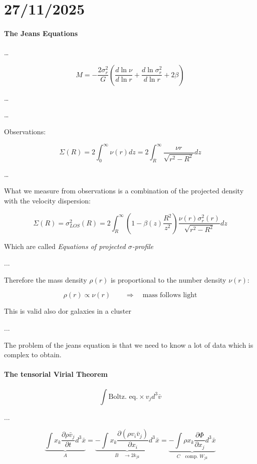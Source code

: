 \chapter{27/11/2025}

\subsubsection{The Jeans Equations}

\dots

$$
M = - \dfrac{2 \sigma_r^2}{G} \left( \dfrac{d \ln \nu}{d \ln r} + \dfrac {d \ln \sigma_r^2}{d \ln r} + 2 \beta \right)
$$

\dots


\dots

Observations:

$$
\Sigma (R) = 2 \int_0^\infty \nu(r) dz = 2 \int_R^\infty \dfrac {\nu r}{\sqrt{r^2 - R^2}} dz 
$$

\dots

What we measure from observations is a combination of the projected density with the velocity dispersion:

$$
\Sigma (R) = \sigma_{LOS}^2(R) = 2 \int_R^\infty \left( 1 - \beta (z) \dfrac {R^2}{z^2} \right) \dfrac {\nu (r) \sigma_r^2(r)}{\sqrt{r^2 - R^2}} dz
$$

Which are called \textit{Equations of projected $\sigma$-profile}

...

Therefore the mass density $\rho(r)$ is proportional to the number density $\nu(r)$:

$$
\rho(r) \propto \nu (r)
\qquad \Rightarrow \quad 
\text{mass follows light}
$$

This is valid also dor galaxies in a cluster

...


The problem of the jeans equation is that we need to know a lot of data which is complex to obtain.

\subsubsection{The tensorial Virial Theorem}

$$
\int \text{Boltz. eq.} \times v_j d^3 \bar v
$$

...

$$
\underbrace{
\int x_k \dfrac {\partial \rho \bar v_j}{\partial t} d^3 \bar x}
_{A} 
= 
\underbrace{
- \int x_k \dfrac {\partial (\rho v_i \bar v_j)}{\partial x_i} d^3 \bar x}
_{B \quad \to 2k_{jk}} 
= 
\underbrace{
- \int \rho x_k \dfrac {\partial \Phi}{\partial x_j} d^3 \bar x
}_{C \quad \text{comp. }W_{jk}} 
$$

